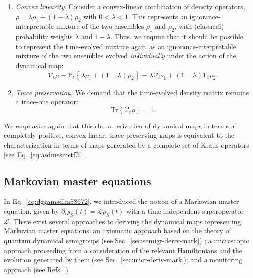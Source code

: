 \documentclass[3p,sort&compress]{elsarticle}
\newcommand{\op}[1]{#1}
\begin{document}
\begin{enumerate}
\item \emph{Convex linearity.} Consider a convex-linear combination of density operators, $\op{\rho} = \lambda \op{\rho}_1 + (1-\lambda) \op{\rho}_2$ with $0 < \lambda < 1$. This represents an ignorance-interpretable mixture of the two ensembles $\op{\rho}_1$ and $\op{\rho}_2$, with (classical) probability weights $\lambda$ and $1-\lambda$. Thus, we require that it should be possible to represent the time-evolved mixture again as an ignorance-interpretable mixture of the two ensembles evolved \emph{individually} under the action of the dynamical map:
%
\begin{equation}
  \label{eq:cl}
\mathcal{V}_t \op{\rho} = \mathcal{V}_t \left\{ \lambda \op{\rho}_1 + (1-\lambda) \op{\rho}_2\right\} = \lambda \mathcal{V}_t\op{\rho}_1 + (1-\lambda) \mathcal{V}_t\op{\rho}_2.
\end{equation}
%

\item \emph{Trace preservation.} We demand that the time-evolved density matrix remains a trace-one operator:
%
\begin{equation}
  \label{eq:t78sccl}
\text{Tr} \left\{ \mathcal{V}_t \op{\rho} \right\} =1.
\end{equation}
%

\end{enumerate}

We emphasize again that this characterization of dynamical maps in terms of completely positive, convex-linear, trace-preserving maps is equivalent to the characterization in terms of maps generated by a complete set of Kraus operators [see Eq.~\eqref{eq:asdmssmetf2}] \cite{Kraus:1983:ee}.

\subsection{Markovian master equations}

In Eq.~\eqref{eq:dggamsdlm58672}, we introduced the notion of a Markovian master equation, given by $\partial_t \op{\rho}_S(t) = \mathcal{L}\op{\rho}_S(t)$ with a time-independent superoperator $\mathcal{L}$. There exist several approaches to deriving the dynamical maps representing Markovian master equations: an axiomatic approach based on the theory of quantum dynamical semigroups (see Sec.~\ref{sec:semigr-deriv-mark}) \cite{Lindblad:1976:um,Gorini:1976:tt,Gorini:1978:uf,Davies:1974:tw,Kossakowski:1972:tf,Alicki:2007:uu}; a microscopic approach proceeding from a consideration of the relevant Hamiltonians and the evolution generated by them (see Sec.~\ref{sec:micr-deriv-mark}); and a monitoring approach (see Refs.~\cite{Hornberger:2006:tc,Hornberger:2008:ii}).
\end{document}
